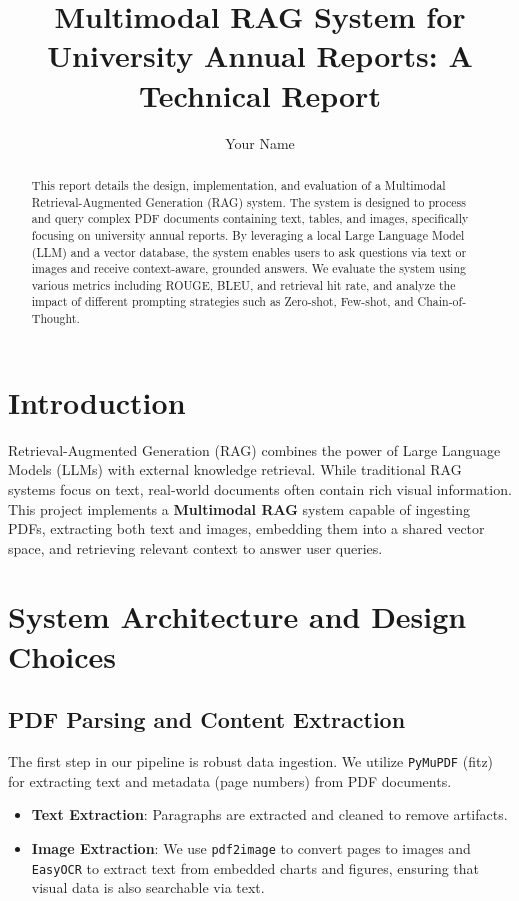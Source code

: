 \documentclass[runningheads]{llncs}
\begin{document}
\title{Multimodal RAG System for University Annual Reports: A Technical Report}
\author{Your Name}
\maketitle

\begin{abstract}
This report details the design, implementation, and evaluation of a Multimodal Retrieval-Augmented Generation (RAG) system. The system is designed to process and query complex PDF documents containing text, tables, and images, specifically focusing on university annual reports. By leveraging a local Large Language Model (LLM) and a vector database, the system enables users to ask questions via text or images and receive context-aware, grounded answers. We evaluate the system using various metrics including ROUGE, BLEU, and retrieval hit rate, and analyze the impact of different prompting strategies such as Zero-shot, Few-shot, and Chain-of-Thought.
\end{abstract}

\section{Introduction}
Retrieval-Augmented Generation (RAG) combines the power of Large Language Models (LLMs) with external knowledge retrieval. While traditional RAG systems focus on text, real-world documents often contain rich visual information. This project implements a \textbf{Multimodal RAG} system capable of ingesting PDFs, extracting both text and images, embedding them into a shared vector space, and retrieving relevant context to answer user queries.

\section{System Architecture and Design Choices}

\subsection{PDF Parsing and Content Extraction}
The first step in our pipeline is robust data ingestion. We utilize \texttt{PyMuPDF} (fitz) for extracting text and metadata (page numbers) from PDF documents.
\begin{itemize}
    \item \textbf{Text Extraction}: Paragraphs are extracted and cleaned to remove artifacts.
    \item \textbf{Image Extraction}: We use \texttt{pdf2image} to convert pages to images and \texttt{EasyOCR} to extract text from embedded charts and figures, ensuring that visual data is also searchable via text.
\end{itemize}
\end{document}
